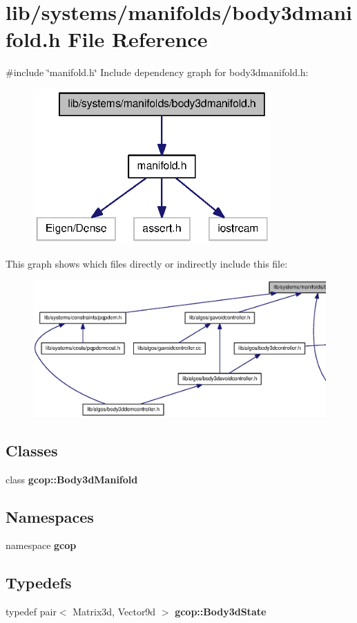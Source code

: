 \section{lib/systems/manifolds/body3dmanifold.h \-File \-Reference}
\label{body3dmanifold_8h}
{\ttfamily \#include \char`\"{}manifold.\-h\char`\"{}}\*
\-Include dependency graph for body3dmanifold.\-h\-:
\nopagebreak
\begin{figure}[H]
\begin{center}
\leavevmode
\includegraphics[width=258pt]{body3dmanifold_8h__incl}
\end{center}
\end{figure}
\-This graph shows which files directly or indirectly include this file\-:
\nopagebreak
\begin{figure}[H]
\begin{center}
\leavevmode
\includegraphics[width=350pt]{body3dmanifold_8h__dep__incl}
\end{center}
\end{figure}
\subsection*{\-Classes}
\begin{DoxyCompactItemize}
\item 
class {\bf gcop\-::\-Body3d\-Manifold}
\end{DoxyCompactItemize}
\subsection*{\-Namespaces}
\begin{DoxyCompactItemize}
\item 
namespace {\bf gcop}
\end{DoxyCompactItemize}
\subsection*{\-Typedefs}
\begin{DoxyCompactItemize}
\item 
typedef pair$<$ \-Matrix3d, \-Vector9d $>$ {\bf gcop\-::\-Body3d\-State}
\end{DoxyCompactItemize}
